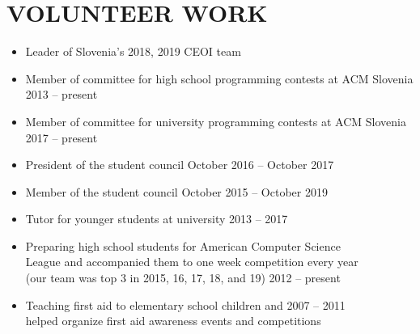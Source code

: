 \documentclass[line,margin]{res}
\begin{document}
\section{VOLUNTEER WORK}
\begin{itemize}
  \item Leader of Slovenia's 2018, 2019 CEOI team
  \item Member of committee for high school programming contests at ACM Slovenia \\ \hspace*{\fill} 2013 -- present
  \item Member of committee for university programming contests at ACM Slovenia \\ \hspace*{\fill} 2017 -- present
  \item President of the student council \hfill October 2016 -- October 2017 \\
  \item Member of the student council \hfill October 2015 -- October 2019 \\
  \item Tutor for younger students at university \hfill 2013 -- 2017
  \item Preparing high school students for American Computer Science \\ League and
  accompanied them to one week competition every year \\
  (our team was top 3 in 2015, 16, 17, 18, and 19)  \hfill 2012 -- present
  \item Teaching first aid to elementary school children and \hfill 2007 -- 2011 \\
  helped organize first aid awareness events and competitions
\end{itemize}


%
%
\end{document}
